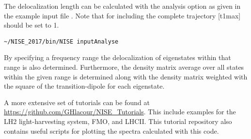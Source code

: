 The delocalization length \cite{Thouless.1974.PR.13.93} can be calculated with the
analysis option as given in the example input file . Note that for
including the complete trajectory [t1max] should be set to 1. 
\begin{lstlisting}[style=mystyle]
~/NISE_2017/bin/NISE inputAnalyse 
\end{lstlisting}
By specifying a frequency range the delocalization of eigenstates within that range
is also determined. Furthermore, the density matrix average over all states within the
given range is determined along with the density matrix weighted with the square of
the transition-dipole for each eigenstate.

A more extensive set of tutorials can be found at
\url{https://github.com/GHlacour/NISE\_Tutorials}. This include examples for the LH2
light-harvesting system, FMO, and LHCII. This tutorial repository also contains useful
scripts for plotting the spectra calculated with this code.

